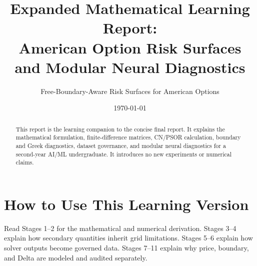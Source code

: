 \documentclass[11pt]{article}
\title{Expanded Mathematical Learning Report:\\
American Option Risk Surfaces and Modular Neural Diagnostics}
\author{Free-Boundary-Aware Risk Surfaces for American Options}
\date{\today}
\begin{document}
\maketitle
\begin{abstract}
This report is the learning companion to the concise final report. It explains
the mathematical formulation, finite-difference matrices, CN/PSOR calculation,
boundary and Greek diagnostics, dataset governance, and modular neural
diagnostics for a second-year AI/ML undergraduate. It introduces no new
experiments or numerical claims.
\end{abstract}

\tableofcontents

\section*{How to Use This Learning Version}
Read Stages 1--2 for the mathematical and numerical derivation. Stages 3--4
explain how secondary quantities inherit grid limitations. Stages 5--6 explain
how solver outputs become governed data. Stages 7--11 explain why price,
boundary, and Delta are modeled and audited separately.




\end{document}
